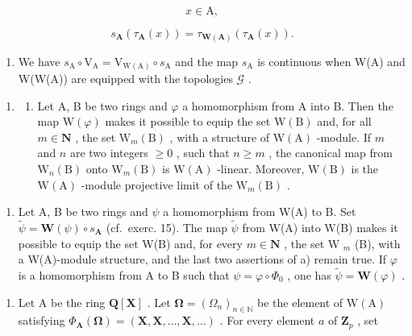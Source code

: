 \[
x \in \mathrm{A},
\]

\[
s _ {\mathbf {A}} \left(\tau_ {\mathbf {A}} (x)\right) = \tau_ {\mathbf {W} (\mathbf {A})} \left(\tau_ {\mathbf {A}} (x)\right).
\]

\begin{enumerate}
\def\labelenumi{\alph{enumi})}
\setcounter{enumi}{5}
\tightlist
\item
  We have \(s_{\mathrm{A}} \circ \mathrm{V}_{\mathrm{A}} = \mathrm{V}_{\mathrm{W(A)}} \circ s_{\mathrm{A}}\) and the map \(s_{\mathrm{A}}\) is continuous when W(A) and W(W(A)) are equipped with the topologies \(\mathcal{G}\) .
\end{enumerate}

\begin{enumerate}
\def\labelenumi{\arabic{enumi})}
\setcounter{enumi}{15}
\tightlist
\item
  \begin{enumerate}
  \def\labelenumii{\alph{enumii})}
  \tightlist
  \item
    Let A, B be two rings and \(\varphi\) a homomorphism from A into B. Then the map \(\mathrm{W}(\varphi)\) makes it possible to equip the set \(\mathrm{W(B)}\) and, for all \(m \in \mathbf{N}\) , the set \(\mathrm{W}_{m}(\mathrm{B})\) , with a structure of \(\mathrm{W(A)}\) -module. If \(m\) and \(n\) are two integers \(\geqslant 0\) , such that \(n \geqslant m\) , the canonical map from \(\mathrm{W}_{n}(\mathrm{B})\) onto \(\mathrm{W}_{m}(\mathrm{B})\) is \(\mathrm{W(A)}\) -linear. Moreover, \(\mathrm{W(B)}\) is the \(\mathrm{W(A)}\) -module projective limit of the \(\mathrm{W}_{m}(\mathrm{B})\) .
  \end{enumerate}
\end{enumerate}

\begin{enumerate}
\def\labelenumi{\alph{enumi})}
\setcounter{enumi}{1}
\tightlist
\item
  Let A, B be two rings and \(\psi\) a homomorphism from W(A) to B. Set \(\tilde{\psi} = \mathbf{W}(\psi) \circ s_{\mathbf{A}}\) (cf.~exerc. 15). The map \(\tilde{\psi}\) from W(A) into W(B) makes it possible to equip the set W(B) and, for every \(m \in \mathbf{N}\) , the set W \(_{m}\) (B), with a W(A)-module structure, and the last two assertions of a) remain true. If \(\varphi\) is a homomorphism from A to B such that \(\psi = \varphi \circ \Phi_{0}\) , one has \(\tilde{\psi} = \mathbf{W}(\varphi)\) .
\end{enumerate}

\begin{enumerate}
\def\labelenumi{\arabic{enumi})}
\setcounter{enumi}{16}
\tightlist
\item
  Let A be the ring \(\mathbf{Q}[\mathbf{X}]\) . Let \(\boldsymbol{\Omega} = (\Omega_n)_{n \in \mathbb{N}}\) be the element of \(\mathrm{W}(\mathrm{A})\) satisfying \(\Phi_{\mathbf{A}}(\boldsymbol{\Omega}) = (\mathbf{X}, \mathbf{X}, ..., \mathbf{X}, ...)\) . For every element \(a\) of \(\mathbf{Z}_p\) , set
\end{enumerate}

